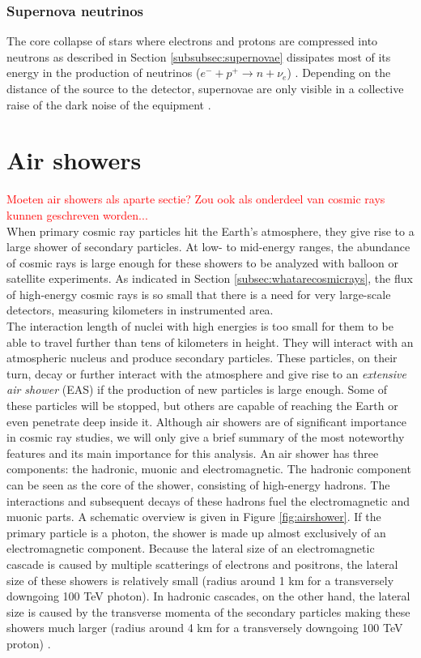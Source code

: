\subsubsection{Supernova neutrinos}
The core collapse of stars where electrons and protons are compressed into neutrons as described in Section \ref{subsubsec:supernovae} dissipates most of its energy in the production of neutrinos ($e^- + p^+ \rightarrow n + \nu_e$) \cite{Scholberg:2012id}. Depending on the distance of the source to the detector, supernovae are only visible in a collective raise of the dark noise of the equipment \cite{Kopke:2011xb}.


\section{Air showers}
\label{sec:airshowers}
\textcolor{red}{Moeten air showers als aparte sectie? Zou ook als onderdeel van cosmic rays kunnen geschreven worden...\\}
When primary cosmic ray particles hit the Earth's atmosphere, they give rise to a large shower of secondary particles. At low- to mid-energy ranges, the abundance of cosmic rays is large enough for these showers to be analyzed with balloon or satellite experiments. As indicated in Section \ref{subsec:whatarecosmicrays}, the flux of high-energy cosmic rays is so small that there is a need for very large-scale detectors, measuring kilometers in instrumented area.\\
\newline
The interaction length of nuclei with high energies is too small for them to be able to travel further than tens of kilometers in height. They will interact with an atmospheric nucleus and produce secondary particles.
These particles, on their turn, decay or further interact with the atmosphere and give rise to an \textit{extensive air shower} (EAS) if the production of new particles is large enough. Some of these particles will be stopped, but others are capable of reaching the Earth or even penetrate deep inside it. 
Although air showers are of significant importance in cosmic ray studies, we will only give a brief summary of the most noteworthy features and its main importance for this analysis.
An air shower has three components: the hadronic, muonic and electromagnetic. The hadronic component can be seen as the core of the shower, consisting of high-energy hadrons. The interactions and subsequent decays of these hadrons fuel the electromagnetic and muonic parts. A schematic overview is given in Figure \ref{fig:airshower}. If the primary particle is a photon, the shower is made up almost exclusively of an electromagnetic component. Because the lateral size of an electromagnetic cascade is caused by multiple scatterings of electrons and positrons, the lateral size of these showers is relatively small (radius around 1 km for a transversely downgoing 100 TeV photon). In hadronic cascades, on the other hand, the lateral size is caused by the transverse momenta of the secondary particles making these showers much larger (radius around 4 km for a transversely downgoing 100 TeV proton) \cite{Grupen:2005rx}.


